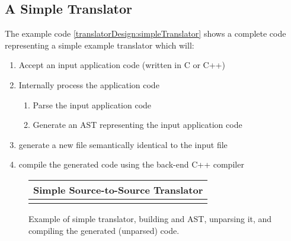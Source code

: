 \subsection{A Simple Translator}

   The example code \ref{translatorDesign:simpleTranslator} shows a complete
code representing a simple example translator which will:
\begin{enumerate}
     \item Accept an input application code (written in C or C++)
     \item Internally process the application code
     \begin{enumerate}
          \item Parse the input application code
          \item Generate an AST representing the input application code
     \end{enumerate}
     \item generate a new file semantically identical to the input file
     \item compile the generated code using the back-end C++ compiler
\end{enumerate}

{\indent
{\mySmallFontSize

\begin{latexonly}
%  
\begin{figure}[tb]
\begin{center}
\begin{tabular}{|c|} \hline
     Simple Source-to-Source Translator
\\\hline\hline

\\\hline
\end{tabular}
\end{center}
\caption{ Example of simple translator, building and AST, unparsing it, and compiling
    the generated (unparsed) code. }
\end{figure}
\end{latexonly}

\begin{htmlonly}
   
\end{htmlonly}

\label{translatorDesign:simpleTranslator}

}
}

